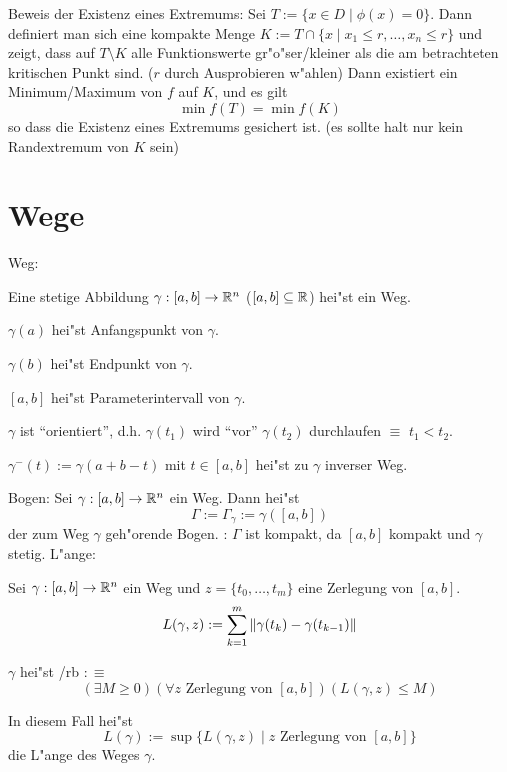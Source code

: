 \trick Beweis der Existenz eines Extremums:{
  Sei $T:=\{x\in D\mid \phi(x)=0\}$. Dann definiert man sich eine 
  kompakte Menge $K:=T\cap\{x\mid x_1\leq r,\ldots,x_n\leq r\}$ und zeigt,
  dass auf $T\setminus K$ alle Funktionswerte gr"o"ser/kleiner als die am
  betrachteten kritischen Punkt sind. ($r$ durch Ausprobieren w"ahlen)
  Dann existiert ein Minimum/Maximum von $f$ auf $K$, und es gilt
  \[\min f(T)=\min f(K)
    \]
  so dass die Existenz eines Extremums gesichert ist. (es sollte halt nur kein 
  Randextremum von $K$ sein)
  }
\section{Wege}
 Weg:{
  Eine stetige Abbildung $\gamma:[a,b]\to\mathbb R^n$ ($[a,b]\subseteq\mathbb R$)
  hei"st ein Weg.
  
  $\gamma(a)$ hei"st Anfangspunkt von $\gamma$.
  
  $\gamma(b)$ hei"st Endpunkt von $\gamma$.
  
  $[a,b]$ hei"st Parameterintervall von $\gamma$.
  
  $\gamma$ ist ``orientiert'', d.h. $\gamma(t_1)$ wird ``vor'' $\gamma(t_2)$
  durchlaufen $\equiv$ $t_1<t_2$.
  
  $\gamma^-(t):=\gamma(a+b-t)$ mit $t\in[a,b]$ hei"st zu $\gamma$ inverser Weg.
  }
\lesserdefinition Bogen:{
  Sei $\gamma:[a,b]\to\mathbb R^n$ ein Weg. Dann hei"st 
  \[\Gamma:=\Gamma_\gamma:=\gamma([a,b])
    \]
  der zum Weg $\gamma$ geh"orende Bogen.
  }
\remark:{
  $\Gamma$ ist kompakt, da $[a,b]$ kompakt und $\gamma$ stetig.
  }
 L"ange:{
  Sei $\gamma:[a,b]\to\mathbb R^n$ ein Weg und $z=\{t_0,\ldots,t_m\}$ eine 
  Zerlegung von $[a,b]$.
  \[L(\gamma,z):=\sum_{k=1}^m \norm{\gamma(t_k)-\gamma(t_{k-1})}
    \]

  $\gamma$ hei"st /rb $:\equiv$
  \[(\exists M\geq 0)(\forall z \text{ Zerlegung von $[a,b]$})(L(\gamma,z)\leq M)
    \]
  
  In diesem Fall hei"st 
  \[L(\gamma):=\sup\{L(\gamma,z)\mid z\text{ Zerlegung von $[a,b]$}\}
    \]
  die L"ange des Weges $\gamma$.
  }
